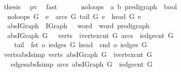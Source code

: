 \begin{isabellebody}
\ {\isacharquery}thesis\ \isamarkupfalse%
\ pv\ \isamarkupfalse%
\ fast\isanewline
\ \ \isamarkupfalse%
\isanewline
{}\isamarkupfalse%
%
\endisatagproof
{\isafoldproof}%
%
\isadelimproof
\isanewline
%
\endisadelimproof
\isanewline
\isanewline
\isanewline
{}\isamarkupfalse%
\ \isanewline
\ \ no{\isacharunderscore}loops\ {\isacharcolon}{\isacharcolon}\ {\isachardoublequoteopen}{\isacharparenleft}{\isacharprime}a{\isacharcomma}\ {\isacharprime}b{\isacharparenright}\ pre{\isacharunderscore}digraph\ {\isasymRightarrow}\ bool{\isachardoublequoteclose}\ \isanewline
{}\isanewline
\ \ {\isachardoublequoteopen}no{\isacharunderscore}loops\ G\ {\isasymequiv}\ {\isasymforall}e\ {\isasymin}\ arcs\ G{\isachardot}\ tail\ G\ e\ {\isasymnoteq}\ head\ G\ e{\isachardoublequoteclose}\isanewline
\isanewline
{}\isamarkupfalse%
\ \isanewline
\ \ abs{\isacharunderscore}IGraph\ {\isacharcolon}{\isacharcolon}\ {\isachardoublequoteopen}IGraph\ {\isasymRightarrow}\ {\isacharparenleft}{}{}\ word{\isacharcomma}\ {}{}\ word{\isacharparenright}\ pre{\isacharunderscore}digraph{\isachardoublequoteclose}\ \isanewline
{}\isanewline
\ \ {\isachardoublequoteopen}abs{\isacharunderscore}IGraph\ G\ {\isasymequiv}\ {\isasymlparr}\ verts\ {\isacharequal}\ {\isacharbraceleft}{}{\isachardot}{\isachardot}{\isacharless}ivertex{\isacharunderscore}cnt\ G{\isacharbraceright}{\isacharcomma}\ arcs\ {\isacharequal}\ {\isacharbraceleft}{}{\isachardot}{\isachardot}{\isacharless}iedge{\isacharunderscore}cnt\ G{\isacharbraceright}{\isacharcomma}\isanewline
\ \ \ \ tail\ {\isacharequal}\ fst\ o\ iedges\ G{\isacharcomma}\ head\ {\isacharequal}\ snd\ o\ iedges\ G\ {\isasymrparr}{\isachardoublequoteclose}\isanewline
\isanewline
{}\isamarkupfalse%
\ verts{\isacharunderscore}absI{\isacharbrackleft}simp{\isacharbrackright}{\isacharcolon}\ {\isachardoublequoteopen}verts\ {\isacharparenleft}abs{\isacharunderscore}IGraph\ G{\isacharparenright}\ {\isacharequal}\ {\isacharbraceleft}{}{\isachardot}{\isachardot}{\isacharless}ivertex{\isacharunderscore}cnt\ G{\isacharbraceright}{\isachardoublequoteclose}\isanewline
\ \ \ edges{\isacharunderscore}absI{\isacharbrackleft}simp{\isacharbrackright}{\isacharcolon}\ {\isachardoublequoteopen}arcs\ {\isacharparenleft}abs{\isacharunderscore}IGraph\ G{\isacharparenright}\ {\isacharequal}\ {\isacharbraceleft}{}{\isachardot}{\isachardot}{\isacharless}iedge{\isacharunderscore}cnt\ G{\isacharbraceright}{\isachardoublequoteclose}\isanewline

\end{isabellebody}
